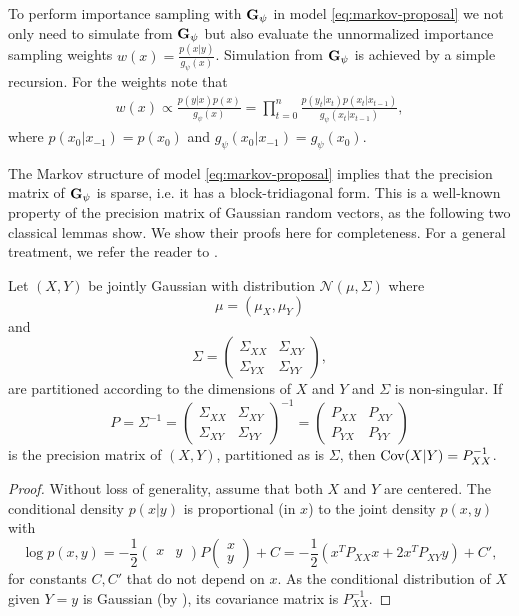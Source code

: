 To perform importance sampling with $\mathbf G_{\psi}$ in model \eqref{eq:markov-proposal} we not only need to simulate from $\mathbf G_{\psi}$ but also evaluate the unnormalized importance sampling weights $w(x) = \frac{p(x|y)}{g_{\psi}(x)}$. Simulation from $\mathbf G_{\psi}$ is achieved by a simple recursion. For the weights note that 
\begin{align}
\label{eq:weights_markov}
w(x) \propto \frac{p(y|x)p(x)}{g_{\psi}(x)} = \prod_{t = 0}^n \frac{p(y_{t}|x_{t})p(x_{t}|x_{t - 1})}{g_{\psi}(x_{t}|x_{t - 1})},
\end{align}
where $p(x_{0}|x_{-1}) = p(x_{0})$ and $g_{\psi}(x_{0}|x_{-1}) = g_{\psi}(x_{0})$.

The Markov structure of model \eqref{eq:markov-proposal} implies that the precision matrix of $\mathbf G_{\psi}$ is sparse, i.e. it has a block-tridiagonal form. This is a well-known property of the precision matrix of Gaussian random vectors, as the following two classical lemmas show. We show their proofs here for completeness. For a general treatment, we refer the reader to \citep[Chapters 3 and 5]{Lauritzen1996Graphical}.

\begin{lemma}
    \label{lem:gaussian_precision}
    Let $(X,Y)$ be jointly Gaussian with distribution $\mathcal N \left( \mu, \Sigma \right)$ where 
    $$
    \mu = \left(\mu_{X}, \mu_{Y}\right)
    $$
    and 
    $$
    \Sigma = \begin{pmatrix}
        \Sigma_{XX} & \Sigma_{XY} \\
        \Sigma_{YX} & \Sigma_{YY}
    \end{pmatrix},
    $$
    are partitioned according to the dimensions of $X$ and $Y$ and $\Sigma$ is non-singular.
    If $$P = \Sigma^{-1} = \begin{pmatrix} \Sigma_{XX} &  \Sigma_{XY} \\ \Sigma_{XY} & \Sigma_{YY} \end{pmatrix}^{-1}=  \begin{pmatrix} P_{XX} & P_{XY} \\ P_{YX} & P_{YY} \end{pmatrix}$$ 
    is the precision matrix of $(X,Y)$, partitioned as is $\Sigma$, then $\operatorname{Cov}(X|Y) = P_{XX}^{-1}$.
\end{lemma}
\begin{proof}
    Without loss of generality, assume that both $X$ and $Y$ are centered. 
    The conditional density $p(x|y)$ is proportional (in $x$) to the joint density $p(x,y)$ with 
    $$\log p(x,y) = -\frac 1 2 \begin{pmatrix} x & y\end{pmatrix}  P \begin{pmatrix} x\\y\end{pmatrix} + C = -\frac 12 \left(x^TP_{XX}x + 2x^TP_{XY}y\right) + C',$$
    for constants $C, C'$ that do not depend on $x$. 
    As the conditional distribution of $X$ given $Y=y$ is Gaussian (by ), its covariance matrix is $P_{XX}^{-1}$.
\end{proof}

